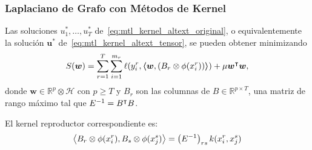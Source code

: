 \documentclass[aspectratio=43]{beamer}
\newcommand{\opt}[1]{{#1}^*}
\newcommand{\upper}[1]{\expandafter\MakeUppercase\expandafter{#1}}
\newcommand{\mymat}[1]{\upper{#1}}
\newcommand{\myvec}[1]{\bm{#1}}
\newcommand{\fv}[1]{\myvec{#1}}
\newcommand{\dotp}[2]{\bm{\left\langle} #1, #2 \bm{\right\rangle}}
\newcommand{\ntasks}{T}
\newcommand{\npertask}{m}
\newcommand{\reals}{\mathbb{R}}
\newcommand{\hilbertspace}{\mathcal{H}}
\newcommand{\lossf}{\ell}
\begin{document}
\begin{frame}
      \frametitle{Laplaciano de Grafo con Métodos de Kernel}

      \begin{lemma}\label{lemma:regproblems_kernel}
            Las soluciones $u_1^*, \ldots, u_\ntasks^*$ de~\eqref{eq:mtl_kernel_altext_original}, o equivalentemente la solución $\opt{\fv{u}}$ de~\eqref{eq:mtl_kernel_altext_tensor},    
            se pueden obtener minimizando
            \begin{equation}
                \label{eq:mtl_kernel_tensor}
                \begin{aligned}
                     & S(\myvec{w}) = \sum_{r=1}^{\ntasks} \sum_{i=1}^{\npertask_r} \lossf(y_i^r, \dotp{\myvec{w}}{(B_r \otimes \phi(x_i^r))}) + \mu  \myvec{w}^\intercal \myvec{w} , \\
                \end{aligned}
            \end{equation}
            donde $\bm{w} \in \reals^p \otimes \hilbertspace$ con $p \geq \ntasks$ y $B_r$ son las columnas de $B \in \reals^{p \times \ntasks}$, una matriz de rango máximo tal que $\mymat{E}^{-1} = \mymat{B}^\intercal \mymat{B}$.
        \end{lemma}
        El kernel reproductor correspondiente es:
        \begin{equation}
            \nonumber
            \dotp{B_r \otimes \phi(x_i^r)}{B_s \otimes \phi(x_j^s)} = \left(E^{-1} \right)_{rs} k(x_i^r, x_j^s) 
        \end{equation}

\end{frame}
\end{document}
